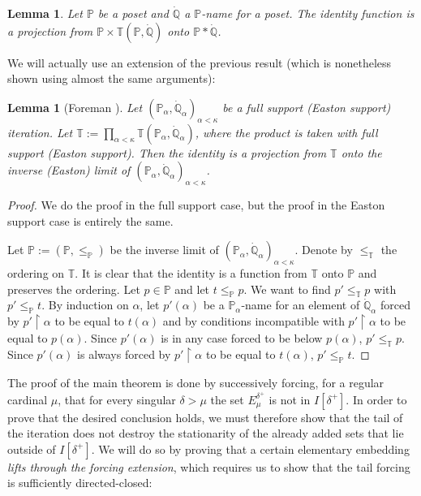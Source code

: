 \documentclass[a4paper]{amsart}
\theoremstyle{definition}
\theoremstyle{remark}
\theoremstyle{plain}
\newtheorem{mylem}[mydef]{Lemma}
\numberwithin{mydef}{section}
\newcommand{\dP}{\mathbb{P}}
\newcommand{\dQ}{\mathbb{Q}}
\newcommand{\dT}{\mathbb{T}}
\newcommand{\uhr}{\upharpoonright}
\begin{document}
	\begin{mylem}\label{Projection}
		Let $\dP$ be a poset and $\dot{\dQ}$ a $\dP$-name for a poset. The identity function is a projection from $\dP\times\dT(\dP,\dot{\dQ})$ onto $\dP*\dot{\dQ}$.
	\end{mylem}
	
	We will actually use an extension of the previous result (which is nonetheless shown using almost the same arguments):
	
	\begin{mylem}[Foreman \cite{ForemanSatIdeal}]\label{TermspaceIteration}
		Let $(\dP_{\alpha},\dot{\dQ}_{\alpha})_{\alpha<\kappa}$ be a full support (Easton support) iteration. Let $\dT:=\prod_{\alpha<\kappa}\dT(\dP_{\alpha},\dot{\dQ}_{\alpha})$, where the product is taken with full support (Easton support). Then the identity is a projection from $\dT$ onto the inverse (Easton) limit of $(\dP_{\alpha},\dot{\dQ}_{\alpha})_{\alpha<\kappa}$.
	\end{mylem}
	
	\begin{proof}
		We do the proof in the full support case, but the proof in the Easton support case is entirely the same.
		
		Let $\dP:=(\dP,\leq_{\dP})$ be the inverse limit of $(\dP_{\alpha},\dot{\dQ}_{\alpha})_{\alpha<\kappa}$. Denote by $\leq_{\dT}$ the ordering on $\dT$. It is clear that the identity is a function from $\dT$ onto $\dP$ and preserves the ordering. Let $p\in\dP$ and let $t\leq_{\dP}p$. We want to find $p'\leq_{\dT}p$ with $p'\leq_{\dP}t$. By induction on $\alpha$, let $p'(\alpha)$ be a $\dP_{\alpha}$-name for an element of $\dot{\dQ}_{\alpha}$ forced by $p'\uhr\alpha$ to be equal to $t(\alpha)$ and by conditions incompatible with $p'\uhr\alpha$ to be equal to $p(\alpha)$. Since $p'(\alpha)$ is in any case forced to be below $p(\alpha)$, $p'\leq_{\dT}p$. Since $p'(\alpha)$ is always forced by $p'\uhr\alpha$ to be equal to $t(\alpha)$, $p'\leq_{\dP}t$.
	\end{proof}
	
	The proof of the main theorem is done by successively forcing, for a regular cardinal $\mu$, that for every singular $\delta>\mu$ the set $E_{\mu}^{\delta^+}$ is not in $I[\delta^+]$. In order to prove that the desired conclusion holds, we must therefore show that the tail of the iteration does not destroy the stationarity of the already added sets that lie outside of $I[\delta^+]$. We will do so by proving that a certain elementary embedding \emph{lifts through the forcing extension}, which requires us to show that the tail forcing is sufficiently directed-closed:
	
\end{document}
